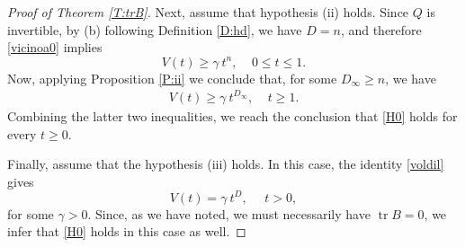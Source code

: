 \documentclass[10pt,a4paper]{amsart}
\newcommand{\tr}{\operatorname{tr}}
\begin{document}
\begin{proof}[Proof of Theorem \ref{T:trB}]
Next, assume that hypothesis (ii) holds. Since $Q$ is invertible, by (b) following Definition \ref{D:hd}, we have $D = n$, and therefore \eqref{vicinoa0} implies
\[
V(t)\ge \gamma\ t^{n},\ \ \ \ \ 0\le t\le 1.
\]
Now, applying Proposition \ref{P:ii} we conclude that, for some $D_\infty \ge n$, we have
\begin{align*}
V(t)\ge \gamma\ t^{D_{\infty}},\ \ \ \ \ t\ge 1.
\end{align*} 
Combining the latter two inequalities, we reach the conclusion that \eqref{H0} holds for every $t\ge 0$.

Finally, assume that the hypothesis (iii) holds. In this case, the identity \eqref{voldil} gives
\[
V(t) = \gamma\ t^D,\ \ \ \ \ \ t>0,
\]
for some $\gamma >0$. Since, as we have noted, we must necessarily have $\tr B = 0$, we infer that \eqref{H0} holds in this case as well.

\end{proof}
\end{document}
